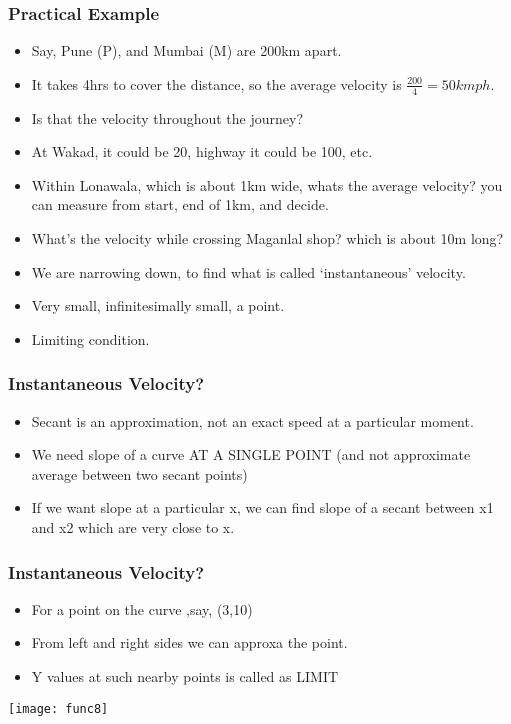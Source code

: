  \begin{frame}[fragile]\frametitle{Practical Example}
\begin{itemize}
\item Say, Pune (P), and Mumbai (M) are 200km apart.
\item It takes 4hrs to cover the distance, so the average velocity is $\frac{200}{4} = 50kmph$.
\item Is that the velocity throughout the journey?
\item At Wakad, it could be 20, highway it could be 100, etc.
\item Within Lonawala, which is about 1km wide, whats the average velocity? you can measure from start, end of 1km, and decide.
\item What's the velocity while crossing Maganlal shop? which is about 10m long?
\item We are narrowing down, to find what is called `instantaneous' velocity.
\item Very small, infinitesimally small, a point.
\item Limiting condition.
\end{itemize}
\end{frame}


 \begin{frame}[fragile]\frametitle{Instantaneous Velocity?}
\begin{itemize}
\item Secant is an approximation, not an exact speed at a particular moment.
\item We need slope of a curve AT A SINGLE POINT (and not approximate average between two secant points)
\item If we want slope at a particular x, we can find slope of a secant between x1 and x2 which are very close to x.
\end{itemize}
\end{frame}

 \begin{frame}[fragile]\frametitle{Instantaneous Velocity?}
\begin{itemize}
\item For a point on the curve ,say, (3,10)
\item From left and right sides we can approxa the point.
\item Y values at such nearby points is called as LIMIT
\end{itemize}
\begin{center}
\texttt{[image: func8]}
\end{center}
\end{frame}


